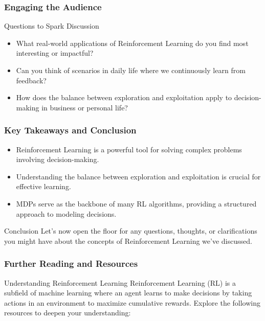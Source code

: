 \documentclass[aspectratio=169]{beamer}
\begin{document}
\begin{frame}[fragile]
    \frametitle{Engaging the Audience}
    \begin{block}{Questions to Spark Discussion}
        \begin{itemize}
            \item What real-world applications of Reinforcement Learning do you find most interesting or impactful?
            \item Can you think of scenarios in daily life where we continuously learn from feedback?
            \item How does the balance between exploration and exploitation apply to decision-making in business or personal life?
        \end{itemize}
    \end{block}
\end{frame}

\begin{frame}[fragile]
    \frametitle{Key Takeaways and Conclusion}
    \begin{itemize}
        \item Reinforcement Learning is a powerful tool for solving complex problems involving decision-making.
        \item Understanding the balance between exploration and exploitation is crucial for effective learning.
        \item MDPs serve as the backbone of many RL algorithms, providing a structured approach to modeling decisions.
    \end{itemize}
    \begin{block}{Conclusion}
        Let's now open the floor for any questions, thoughts, or clarifications you might have about the concepts of Reinforcement Learning we've discussed.
    \end{block}
\end{frame}

\begin{frame}[fragile]
    \frametitle{Further Reading and Resources}
    \begin{block}{Understanding Reinforcement Learning}
        Reinforcement Learning (RL) is a subfield of machine learning where an agent learns to make decisions by taking actions in an environment to maximize cumulative rewards. 
        Explore the following resources to deepen your understanding:
    \end{block}
\end{frame}
\end{document}
